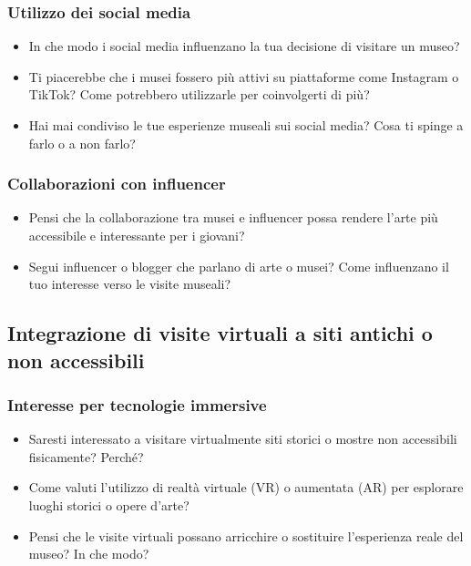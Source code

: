 \documentclass{article}
\begin{document}
\subsubsection{Utilizzo dei social media}

\begin{itemize}
    \item In che modo i social media influenzano la tua decisione di visitare un museo?
    \item Ti piacerebbe che i musei fossero più attivi su piattaforme come Instagram o TikTok? Come potrebbero utilizzarle per coinvolgerti di più?
    \item Hai mai condiviso le tue esperienze museali sui social media? Cosa ti spinge a farlo o a non farlo?
\end{itemize}

\subsubsection{Collaborazioni con influencer}

\begin{itemize}
    \item Pensi che la collaborazione tra musei e influencer possa rendere l’arte più accessibile e interessante per i giovani?
    \item Segui influencer o blogger che parlano di arte o musei? Come influenzano il tuo interesse verso le visite museali?
\end{itemize}

\subsection{Integrazione di visite virtuali a siti antichi o non accessibili}

\subsubsection{Interesse per tecnologie immersive}

\begin{itemize}
    \item Saresti interessato a visitare virtualmente siti storici o mostre non accessibili fisicamente? Perché?
    \item Come valuti l’utilizzo di realtà virtuale (VR) o aumentata (AR) per esplorare luoghi storici o opere d’arte?
    \item Pensi che le visite virtuali possano arricchire o sostituire l’esperienza reale del museo? In che modo?
\end{itemize}
\end{document}
